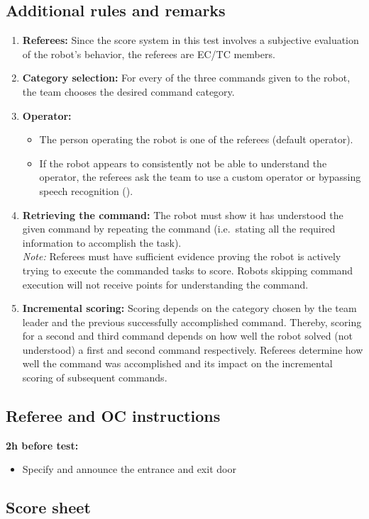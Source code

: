 \subsection{Additional rules and remarks}
\label{sec:gpsr_remarks}
\begin{enumerate}
	\item \textbf{Referees:} Since the score system in this test involves a subjective evaluation of the robot's behavior, the referees are EC/TC members.

	\item \textbf{Category selection:} For every of the three commands given to the robot, the team chooses the desired command category.

	\item \textbf{Operator:}
	\begin{itemize}
		\item The person operating the robot is one of the referees (default operator).
		\item If the robot appears to consistently not be able to understand the operator, the referees ask the team to use a custom operator or bypassing speech recognition ().
	\end{itemize}

	\item \textbf{Retrieving the command:} The robot must show it has understood the given command by repeating the command (i.e.~stating all the required information to accomplish the task).
	\\
	\textit{Note:} Referees must have sufficient evidence proving the robot is actively trying to execute the commanded tasks to score. Robots skipping command execution will not receive points for understanding the command.

	\item \textbf{Incremental scoring:} Scoring depends on the category chosen by the team leader and the previous successfully accomplished command. Thereby, scoring for a second and third command depends on how well the robot solved (not understood) a first and second command respectively. Referees determine how well the command was accomplished and its impact on the incremental scoring of subsequent commands.
\end{enumerate}

\subsection{Referee and OC instructions}
\textbf{2h before test:}
\begin{itemize}
	\item Specify and announce the entrance and exit door
\end{itemize}

\newpage
\subsection{Score sheet}


